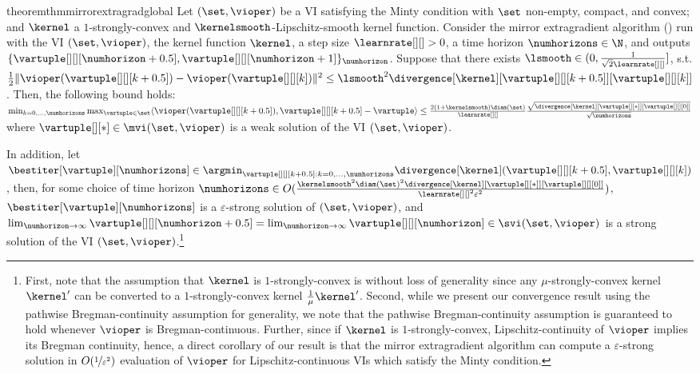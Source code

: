\begin{restatable}{theorem}{thmmirrorextragradglobal}\label{thm:mirror_extragradient_global_convergence}
    Let $(\set, \vioper)$ be a VI  satisfying the Minty condition with $\set$ non-empty, compact, and convex; and $\kernel$ a $1$-strongly-convex and $\kernelsmooth$-Lipschitz-smooth kernel function. Consider the mirror extragradient algorithm ()  run with the VI $(\set, \vioper)$, the kernel function $\kernel$, a step size $\learnrate[ ][ ] > 0$, a time horizon $\numhorizons \in \N$, and outputs $\{\vartuple[][][\numhorizon + 0.5], \vartuple[][][\numhorizon + 1]\}_{\numhorizon}$. Suppose that there exists $\lsmooth \in (0, \frac{1}{\sqrt{2}\learnrate[ ][ ]}]$, s.t. $\frac{1}{2}\|\vioper(\vartuple[][][k+0.5]) - \vioper(\vartuple[][][k])\|^2 \leq \lsmooth^2 \divergence[\kernel][{\vartuple[][][k+0.5]}][{\vartuple[][][k]}]$. Then, the following bound holds:\\
    $
     \min_{k = 0, \hdots, \numhorizons} \max_{\vartuple \in \set} \langle \vioper(\vartuple[][][k + 0.5]), \vartuple[][][k + 0.5] - \vartuple \rangle \leq  \frac{2 (1 + \kernelsmooth) \diam(\set)}{\learnrate[ ][ ]} \frac{\sqrt{\divergence[\kernel][{\vartuple[][*]}][{\vartuple[][][0]}]}}{\sqrt{\numhorizons}}
    $
    where $\vartuple[][*] \in \mvi(\set, \vioper)$ is a weak solution of the VI $(\set, \vioper)$.
    
    In addition, let $\bestiter[\vartuple][\numhorizons] \in \argmin_{\vartuple[][][k+0.5] : k = 0, \hdots, \numhorizons} \divergence[\kernel](\vartuple[][][k+0.5], \vartuple[][][k])$, then, for some choice of time horizon $\numhorizons \in O(\frac{\kernelsmooth^2\diam(\set)^2\divergence[\kernel][{\vartuple[][*]}][{\vartuple[][][0]}]}{\learnrate[ ][ ]^2\varepsilon^2})$,  $\bestiter[\vartuple][\numhorizons]$ is a $\varepsilon$-strong solution of $(\set, \vioper)$, and $\lim_{\numhorizon \to \infty} \vartuple[][][\numhorizon +0.5] = \lim_{\numhorizon \to \infty} \vartuple[][][\numhorizon] \in \svi(\set, \vioper)$ is a strong solution of the VI $(\set, \vioper)$.\footnote{    First, note that the assumption that $\kernel$ is $1$-strongly-convex is without loss of generality since any $\mu$-strongly-convex kernel $\kernel^\prime$ can be converted to a $1$-strongly-convex kernel $\frac{1}{\mu}\kernel^\prime$.
% 
    Second, while we present our convergence result using the pathwise Bregman-continuity assumption for generality, we note that the pathwise Bregman-continuity assumption is guaranteed to hold whenever $\vioper$ is Bregman-continuous. Further, since if $\kernel$ is $1$-strongly-convex, Lipschitz-continuity of $\vioper$ implies its Bregman continuity, hence, a direct corollary of our result is that the mirror extragradient algorithm can compute a $\varepsilon$-strong solution in $O(\nicefrac{1}{\varepsilon^2})$ evaluation of $\vioper$ for Lipschitz-continuous VIs which satisfy the Minty condition.}
\end{restatable}
% 
% 

